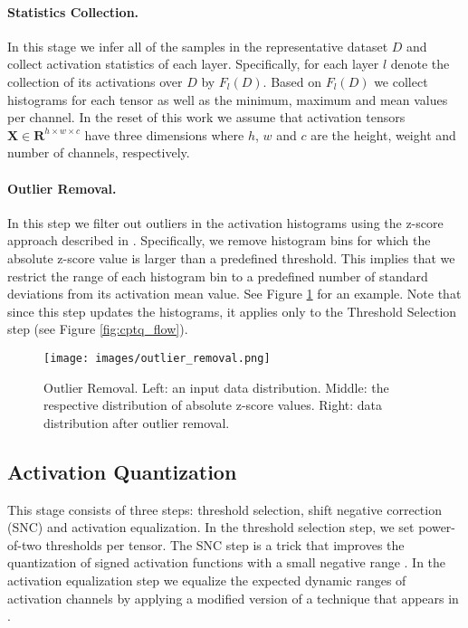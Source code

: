 \documentclass{article}
\newcommand{\brackets}[1]{\left(#1\right)}
\newcommand{\matsym}[1]{\mathbf{#1}}
\begin{document}
\paragraph{Statistics Collection.}
In this stage we infer all of the samples in the representative dataset $D$ and collect activation statistics of each layer. Specifically, for each layer $l$ denote the collection of its activations over $D$ by $F_l\brackets{D}$.
Based on $F_l\brackets{D}$ we collect histograms for each tensor as well as the minimum, maximum and mean values per channel. In the reset of this work we assume that activation tensors $\matsym{X}\in\mathbf{R}^{h\times w \times c}$  have three dimensions where $h$, $w$ and $c$ are the height, weight and number of channels, respectively.

\paragraph{Outlier Removal.}
In this step we filter out outliers in the activation histograms using the z-score approach described in \cite{aggarwal2015outlier}. 
Specifically, we remove histogram bins for which the absolute z-score value is larger than a predefined threshold. This implies that we restrict the range of each histogram bin to a predefined number of standard deviations from its activation mean value. 
See Figure \ref{fig:z_score} for an example.
Note that since this step updates the histograms, it applies only to the Threshold Selection step (see Figure \ref{fig:cptq_flow}).



\begin{figure}[H]
     \centering
     \texttt{[image: images/outlier\_removal.png]}
     \caption{Outlier Removal. Left: an input data distribution. Middle: the respective distribution of absolute z-score values. Right: data distribution after outlier removal.}
     \label{fig:z_score}
\end{figure}
 

\subsection{Activation Quantization}
This stage consists of three steps: threshold selection, shift negative correction (SNC) and activation equalization.  
In the threshold selection step, we set power-of-two thresholds per tensor. The SNC step is a trick that improves the quantization of signed activation functions with a small negative range \cite{bhalgat2020lsq+}. 
In the activation equalization step we equalize the expected dynamic ranges of activation channels by applying a modified version of a technique that appears in \cite{nagel2019data}. 
\end{document}
